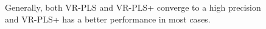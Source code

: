 \documentclass[runningheads,a4paper]{llncs}
\begin{document}
 \begin{figure}[ht]
\centering

\caption{Generally, both VR-PLS and VR-PLS+ converge to a high precision and VR-PLS+ has a better performance in most cases.}
\label{pls}
\end{figure}
 

 
 
\end{document}
